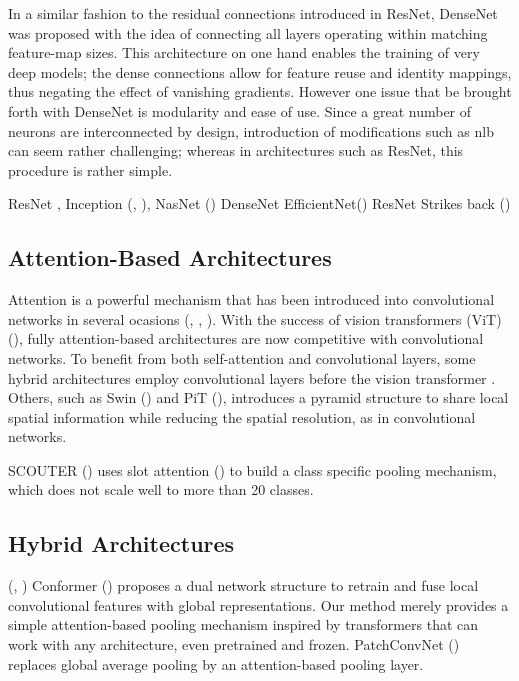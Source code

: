 In a similar fashion to the residual connections introduced in ResNet, DenseNet 
\autocite{huang2017densely} was proposed with the idea of connecting all layers operating within 
matching feature-map sizes. This architecture on one hand enables the training of very deep 
models; the dense connections allow for feature reuse and identity mappings, thus negating the 
effect of vanishing gradients. However one issue that be brought forth with DenseNet is modularity 
and ease of use. Since a great number of neurons are interconnected by design, introduction of 
modifications such as \gls{nlb}\cite{wang2018non} can seem  rather challenging; whereas in 
architectures such as ResNet, this procedure is rather simple.



ResNet \cite{he2016deep}, 
Inception (\cite{szegedy2015going}, \cite{szegedy2016rethinking}), NasNet (\cite{zoph2018learning})
DenseNet \autocite{huang2017densely} EfficientNet(\cite{tan2019efficientnet}) 
ResNet Strikes back (\cite{wightman2021resnet}) \autocite{liu2022convnet}

\subsection{Attention-Based Architectures}
\label{rel:sub_att}
Attention is a powerful mechanism that has been introduced into convolutional networks in several 
ocasions (\cite{bello2019attention}, \cite{ramachandran2019stand}, \cite{shen2020global}). 
With the success of vision transformers (ViT) (\cite{dosovitskiy2020image}), fully attention-based 
architectures are now competitive with convolutional networks. To benefit from both self-attention 
and convolutional layers, some hybrid architectures employ convolutional layers before the vision transformer 
. Others, such as Swin (\cite{liu2021swin}) and PiT 
(\cite{heo2021rethinking}), introduces a pyramid structure to share local spatial information 
while reducing the spatial resolution, as in convolutional networks. 

SCOUTER (\cite{li2021scouter}) uses slot attention (\cite{locatello2020object}) to build a class 
specific pooling mechanism, which does not scale well to more than 20 classes. 

\subsection{Hybrid Architectures}
\label{rel:sub_hybrid}
(\cite{graham2021levit}, \cite{xiao2021early})
Conformer (\cite{peng2021conformer}) proposes a dual network structure to retrain and fuse local 
convolutional features with global representations. Our method merely provides a simple 
attention-based pooling mechanism inspired by transformers that can work with any architecture, 
even pretrained and frozen. PatchConvNet (\cite{touvron2021augmenting}) replaces global average pooling by an 
attention-based pooling layer.
